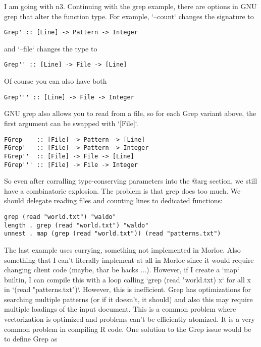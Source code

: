 \documentclass[12pt]{article}
\begin{document}
I am going with n3. Continuing with the grep example, there are options in GNU
grep that alter the function type. For example, `--count` changes the signature
to

\begin{verbatim}
Grep' :: [Line] -> Pattern -> Integer
\end{verbatim}

and `--file` changes the type to

\begin{verbatim}
Grep'' :: [Line] -> File -> [Line]
\end{verbatim}

Of course you can also have both

\begin{verbatim}
Grep''' :: [Line] -> File -> Integer
\end{verbatim}

GNU grep also allows you to read from a file, so for each Grep variant above,
the first argument can be swapped with `[File]`.

\begin{verbatim}
FGrep    :: [File] -> Pattern -> [Line]
FGrep'   :: [File] -> Pattern -> Integer
FGrep''  :: [File] -> File -> [Line]
FGrep''' :: [File] -> File -> Integer
\end{verbatim}

So even after corralling type-conserving parameters into the @arg section, we
still have a combinatoric explosion. The problem is that grep does too much. We
should delegate reading files and counting lines to dedicated functions:

\begin{verbatim}
grep (read "world.txt") "waldo"
length . grep (read "world.txt") "waldo"
unnest . map (grep (read "world.txt")) (read "patterns.txt")
\end{verbatim}

The last example uses currying, something not implemented in Morloc. Also
something that I can't literally implement at all in Morloc since it would require
changing client code (maybe, thar be hacks ...). However, if I create a `map`
builtin, I can compile this with a loop calling `grep (read "world.txt) x` for
all x in `(read "patterns.txt")`. However, this is inefficient. Grep has
optimizations for searching multiple patterns (or if it doesn't, it should) and
also this may require multiple loadings of the input document. This is a common
problem where vectorization is optimized and problems can't be efficiently
atomized. It is a very common problem in compiling R code. One solution to the
Grep issue would be to define Grep as
\end{document}
